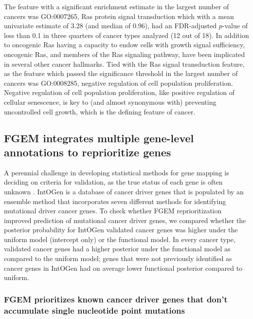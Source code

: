 The feature with a significant enrichment estimate in the largest number of cancers was GO:0007265, Ras protein signal transduction which with a mean univariate estimate of 3.28 (and median of 0.96), had an FDR-adjusted $p$-value of
less than 0.1 in three quarters of cancer types analyzed (12 out of 18). In addition to oncogenic Ras having a capacity to endow cells with growth signal sufficiency, oncogenic Ras, and members of the Ras signaling pathway, have been implicated in several other cancer hallmarks\cite{Pylayeva_Gupta_2011}.  Tied with the Ras signal transduction feature, as the feature which passed the significance threshold in the largest number of cancers was GO:0008285, negative
regulation of cell population proliferation.  Negative regulation of cell population proliferation, like positive regulation of cellular senescence, is key to (and almost synonymous with) preventing uncontrolled cell growth,
which is the defining feature of cancer\cite{Hanahan_2011}.

\subsection{FGEM integrates multiple gene-level annotations to reprioritize genes}\label{sec:orgf0225be}

A perennial challenge in developing statistical methods for gene mapping is deciding on criteria for validation, as the true status of each gene is often unknown\cite{Schaid_2018} \cite{drivermaps}.  IntOGen is a database of cancer driver genes that is populated by an ensemble method that incorporates seven different methods for identifying mutational driver cancer genes. To check whether FGEM reprioritization improved prediction of mutational cancer driver genes, we compared whether the posterior probability for IntOGen validated cancer genes was higher under the uniform model (intercept only) or the functional model. In every cancer type, validated cancer genes had a higher posterior under the functional model as compared to the uniform model;  genes that were not previously identified as cancer genes in IntOGen had on average lower functional posterior compared to uniform.


\subsubsection{FGEM prioritizes known cancer driver genes that don't accumulate single nucleotide point mutations}

